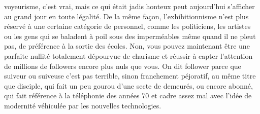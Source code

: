 voyeurisme, c’est vrai, mais ce qui était jadis honteux peut aujourd’hui s’afficher au grand jour en toute légalité. De la même façon, l’exhibitionnisme n’est plus réservé à une certaine catégorie de personnel, comme les politiciens, les artistes ou les gens qui se baladent à poil sous des imperméables même quand il ne pleut pas, de préférence à la sortie des écoles. Non, vous pouvez maintenant être une parfaite nullité totalement dépourvue de charisme et réussir à capter l’attention de millions de followers encore plus nuls que vous. On dit follower parce que suiveur ou suiveuse c’est pas terrible, sinon franchement péjoratif, au même titre que disciple, qui fait un peu gourou d’une secte de demeurés, ou encore abonné, qui fait référence à la téléphonie des années 70 et cadre assez mal avec l’idée de modernité véhiculée par les nouvelles technologies.

